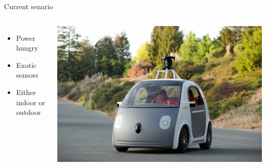 \documentclass[17pt,mathserif]{beamer}
\begin{document}
    
    \begin{frame}{Current senario} %
      \vspace*{-3em}        
      \begin{columns}[c] %
          \begin{itemize}
            \item Power hungry
            \item Exotic sensors
            \item Either indoor or outdoor
          \end{itemize}
        \hspace*{-3em}
        \includegraphics[width=1.5\textwidth]{Google_Self-Driving_Prototype__1_}
      \end{columns}
    \end{frame}
    
\end{document}
